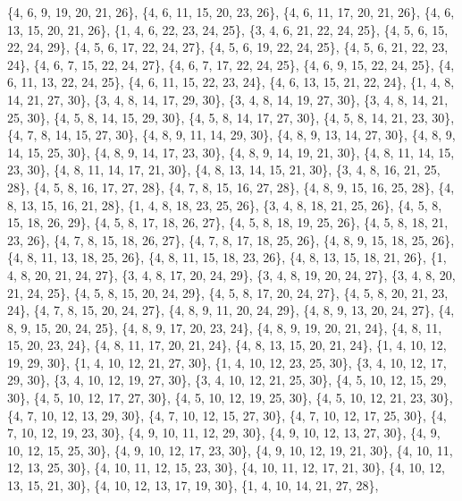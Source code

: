 \documentclass[11pt,a4paper]{article}
\begin{document}
{\{4, 6, 9, 19, 20, 21, 26\}, \{4, 6, 11, 15, 20, 23, 26\}, \{4, 6, 11, 17, 20, 21, 26\}, \{4, 6, 13, 15, 20, 21, 26\}, \{1, 4, 6, 22, 23, 24, 25\},
\{3, 4, 6, 21, 22, 24, 25\}, \{4, 5, 6, 15, 22, 24, 29\}, \{4, 5, 6, 17, 22, 24, 27\}, \{4, 5, 6, 19, 22, 24, 25\}, \{4, 5, 6, 21, 22, 23, 24\},
\{4, 6, 7, 15, 22, 24, 27\}, \{4, 6, 7, 17, 22, 24, 25\}, \{4, 6, 9, 15, 22, 24, 25\}, \{4, 6, 11, 13, 22, 24, 25\}, \{4, 6, 11, 15, 22, 23, 24\},
\{4, 6, 13, 15, 21, 22, 24\}, \{1, 4, 8, 14, 21, 27, 30\}, \{3, 4, 8, 14, 17, 29, 30\}, \{3, 4, 8, 14, 19, 27, 30\}, \{3, 4, 8, 14, 21, 25, 30\},
\{4, 5, 8, 14, 15, 29, 30\}, \{4, 5, 8, 14, 17, 27, 30\}, \{4, 5, 8, 14, 21, 23, 30\}, \{4, 7, 8, 14, 15, 27, 30\}, \{4, 8, 9, 11, 14, 29, 30\},
\{4, 8, 9, 13, 14, 27, 30\}, \{4, 8, 9, 14, 15, 25, 30\}, \{4, 8, 9, 14, 17, 23, 30\}, \{4, 8, 9, 14, 19, 21, 30\}, \{4, 8, 11, 14, 15, 23, 30\},
\{4, 8, 11, 14, 17, 21, 30\}, \{4, 8, 13, 14, 15, 21, 30\}, \{3, 4, 8, 16, 21, 25, 28\}, \{4, 5, 8, 16, 17, 27, 28\}, \{4, 7, 8, 15, 16, 27, 28\},
\{4, 8, 9, 15, 16, 25, 28\}, \{4, 8, 13, 15, 16, 21, 28\}, \{1, 4, 8, 18, 23, 25, 26\}, \{3, 4, 8, 18, 21, 25, 26\}, \{4, 5, 8, 15, 18, 26, 29\},
\{4, 5, 8, 17, 18, 26, 27\}, \{4, 5, 8, 18, 19, 25, 26\}, \{4, 5, 8, 18, 21, 23, 26\}, \{4, 7, 8, 15, 18, 26, 27\}, \{4, 7, 8, 17, 18, 25, 26\},
\{4, 8, 9, 15, 18, 25, 26\}, \{4, 8, 11, 13, 18, 25, 26\}, \{4, 8, 11, 15, 18, 23, 26\}, \{4, 8, 13, 15, 18, 21, 26\}, \{1, 4, 8, 20, 21, 24, 27\},
\{3, 4, 8, 17, 20, 24, 29\}, \{3, 4, 8, 19, 20, 24, 27\}, \{3, 4, 8, 20, 21, 24, 25\}, \{4, 5, 8, 15, 20, 24, 29\}, \{4, 5, 8, 17, 20, 24, 27\},
\{4, 5, 8, 20, 21, 23, 24\}, \{4, 7, 8, 15, 20, 24, 27\}, \{4, 8, 9, 11, 20, 24, 29\}, \{4, 8, 9, 13, 20, 24, 27\}, \{4, 8, 9, 15, 20, 24, 25\},
\{4, 8, 9, 17, 20, 23, 24\}, \{4, 8, 9, 19, 20, 21, 24\}, \{4, 8, 11, 15, 20, 23, 24\}, \{4, 8, 11, 17, 20, 21, 24\}, \{4, 8, 13, 15, 20, 21, 24\},
\{1, 4, 10, 12, 19, 29, 30\}, \{1, 4, 10, 12, 21, 27, 30\}, \{1, 4, 10, 12, 23, 25, 30\}, \{3, 4, 10, 12, 17, 29, 30\}, \{3, 4, 10, 12, 19, 27, 30\},
\{3, 4, 10, 12, 21, 25, 30\}, \{4, 5, 10, 12, 15, 29, 30\}, \{4, 5, 10, 12, 17, 27, 30\}, \{4, 5, 10, 12, 19, 25, 30\}, \{4, 5, 10, 12, 21, 23, 30\},
\{4, 7, 10, 12, 13, 29, 30\}, \{4, 7, 10, 12, 15, 27, 30\}, \{4, 7, 10, 12, 17, 25, 30\}, \{4, 7, 10, 12, 19, 23, 30\}, \{4, 9, 10, 11, 12, 29, 30\},
\{4, 9, 10, 12, 13, 27, 30\}, \{4, 9, 10, 12, 15, 25, 30\}, \{4, 9, 10, 12, 17, 23, 30\}, \{4, 9, 10, 12, 19, 21, 30\}, \{4, 10, 11, 12, 13, 25, 30\},
\{4, 10, 11, 12, 15, 23, 30\}, \{4, 10, 11, 12, 17, 21, 30\}, \{4, 10, 12, 13, 15, 21, 30\}, \{4, 10, 12, 13, 17, 19, 30\}, \{1, 4, 10, 14, 21, 27, 28\},
}
\end{document}
